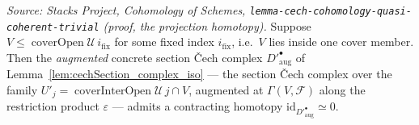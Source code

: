 \begin{lemma}
  \textit{Source: Stacks Project, Cohomology of Schemes,
  \texttt{lemma-cech-cohomology-quasi-coherent-trivial} (proof, the projection homotopy).}
  Suppose \(V \le \operatorname{coverOpen}\mathcal{U}\,i_{\mathrm{fix}}\) for some fixed index
  \(i_{\mathrm{fix}}\), i.e.\ \(V\) lies inside one cover member. Then the \emph{augmented}
  concrete section {\v C}ech complex \(D'^\bullet_{\mathrm{aug}}\) of
  Lemma~\ref{lem:cechSection_complex_iso} --- the section {\v C}ech complex over the family
  \(U'_j = \operatorname{coverInterOpen}\mathcal{U}\,j \cap V\), augmented at
  \(\Gamma(V, \mathcal{F})\) along the restriction product \(\varepsilon\) --- admits a
  contracting homotopy \(\mathrm{id}_{D'^\bullet_{\mathrm{aug}}} \simeq 0\).
\end{lemma}
